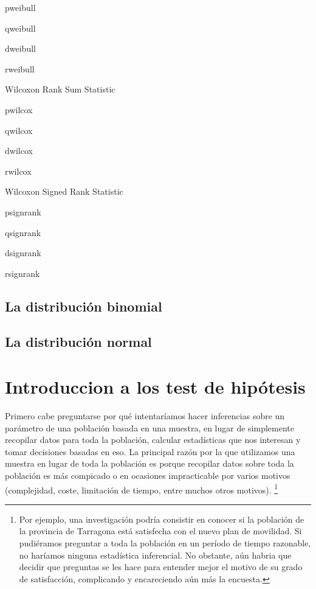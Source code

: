 \documentclass[
]{book}
\begin{document}
pweibull

qweibull

dweibull

rweibull

Wilcoxon Rank Sum Statistic

pwilcox

qwilcox

dwilcox

rwilcox

Wilcoxon Signed Rank Statistic

psignrank

qsignrank

dsignrank

rsignrank

\hypertarget{la-distribuciuxf3n-binomial}{%
\subsection{La distribución binomial}\label{la-distribuciuxf3n-binomial}}

\hypertarget{la-distribuciuxf3n-normal}{%
\subsection{La distribución normal}\label{la-distribuciuxf3n-normal}}

\hypertarget{introduccion-a-los-test-de-hipuxf3tesis}{%
\section{Introduccion a los test de hipótesis}\label{introduccion-a-los-test-de-hipuxf3tesis}}

Primero cabe preguntarse por qué intentaríamos hacer inferencias sobre un parámetro de una población basada en una muestra, en lugar de simplemente recopilar datos para toda la población, calcular estadísticas que nos interesan y tomar decisiones basadas en eso. La principal razón por la que utilizamos una muestra en lugar de toda la población es porque recopilar datos sobre toda la población es más compicado o en ocasiones impracticable por varios motivos (complejidad, coste, limitación de tiempo, entre muchos otros motivos). \footnote{Por ejemplo, una investigación podría consistir en conocer si la población de la provincia de Tarragona está satisfecha con el nuevo plan de movilidad. Si pudiéramos preguntar a toda la población en un período de tiempo razonable, no haríamos ninguna estadística inferencial. No obstante, aún habria que decidir que preguntas se les hace para entender mejor el motivo de su grado de satisfacción, complicando y encareciendo aún más la encuesta.}
\end{document}
